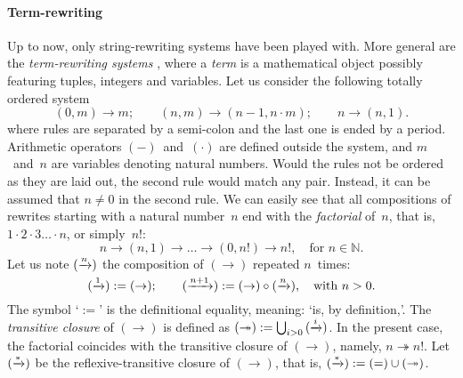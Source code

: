 \paragraph{Term-rewriting}

Up to now, only string\hyp{}rewriting systems have been played
with. More general are the \emph{term\hyp{}rewriting
  systems} \citep{BaaderNipkow_1998}, where a
\emph{term} is a mathematical object possibly featuring
tuples, integers and variables. Let us consider the following totally
ordered system
\begin{equation}
(0,m) \rightarrow m;\qquad
(n,m) \rightarrow (n-1,n \cdot m);\qquad
n     \rightarrow (n,1).
\label{eq:fact_tf}
\end{equation}
where rules are separated by a semi\hyp{}colon and the last one is
ended by a period. Arithmetic operators \((-)\)~and~\((\cdot)\) are
defined outside the system, and \(m\)~and~\(n\) are variables denoting
natural numbers. Would the rules not be ordered as they are laid out,
the second rule would match any pair. Instead, it can be assumed that
\(n \neq 0\) in the second rule. We can easily see that all
compositions of rewrites starting with a natural number~\(n\) end with
the \emph{factorial} of~\(n\), that is, \(1 \cdot 2
\cdot 3 \dots \cdot n\), or simply~\(n!\):
\begin{equation*}
n \rightarrow (n,1) \rightarrow \dots \rightarrow (0,n!) \rightarrow
n!, \quad \text{for \(n \in \mathbb{N}\)}.
\end{equation*}
Let us note \((\xrightarrow{\smash{n}})\) the composition of
\((\rightarrow)\) repeated \(n\)~times:
\begin{equation*}
  (\xrightarrow{\smash{1}})   := (\rightarrow);\qquad
  (\xrightarrow{\smash{n+1}}) :=
     (\rightarrow) \circ (\xrightarrow{\smash{n}}),
\quad \text{with \(n > 0\)}.
\end{equation*}
The symbol `\(:=\)' is the definitional equality, meaning: `is, by
definition,'. The \emph{transitive closure} \label{transitive_closure} of \((\rightarrow)\) is defined
as \((\twoheadrightarrow) := \bigcup_{i >
  0}{(\xrightarrow{\smash{i}})}\). In the present case, the
factorial coincides with the transitive closure of
\((\rightarrow)\), namely, \(n \twoheadrightarrow n!\). Let
\((\xrightarrow{\smash{*}})\) be the reflexive\hyp{}transitive closure
of \((\rightarrow)\), that is, \((\xrightarrow{\smash{*}}) := (=) \cup
(\twoheadrightarrow)\).


